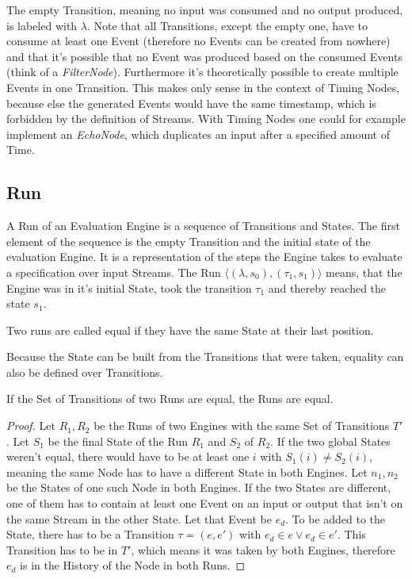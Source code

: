 The empty Transition, meaning no input was consumed and no output produced, is labeled with \(\lambda\).
Note that all Transitions, except the empty one, have to consume at least one Event (therefore no Events can be created from nowhere) and that it's possible that no Event was produced based on the consumed Events (think of a \emph{FilterNode}).
Furthermore it's theoretically possible to create multiple Events in one Transition.
This makes only sense in the context of Timing Nodes, because else the generated Events would have the same timestamp, which is forbidden by the definition of Streams.
With Timing Nodes one could for example implement an \emph{EchoNode}, which duplicates an input after a specified amount of Time.


\subsection{Run}
\label{sec:concepts:def:run}

A Run of an Evaluation Engine is a sequence of Transitions and States.
The first element of the sequence is the empty Transition and the initial state of the evaluation Engine.
It is a representation of the steps the Engine takes to evaluate a specification over input Streams.
The Run \(\langle (\lambda, s_0), (\tau_1, s_1) \rangle\) means, that the Engine was in it's initial State, took the transition \(\tau_1\) and thereby reached the state \(s_1\).

\begin{definition}
  Two runs are called equal if they have the same State at their last position.
\label{def:equal_runs}
\end{definition}

Because the State can be built from the Transitions that were taken, equality can also be defined over Transitions.

\begin{lemma}
If the Set of Transitions of two Runs are equal, the Runs are equal.
\label{lemma:equal_runs_with_transitions}
\end{lemma}
\begin{proof}
  Let \(R_1, R_2\) be the Runs of two Engines with the same Set of Transitions \(T'\).
  Let \(S_1\) be the final State of the Run \(R_1\) and \(S_2\) of \(R_2\).
  If the two global States weren't equal, there would have to be at least one \(i\) with \(S_1(i) \neq S_2(i)\), meaning the same Node has to have a different State in both Engines.
  Let \(n_1, n_2\) be the States of one such Node in both Engines.
  If the two States are different, one of them has to contain at least one Event on an input or output that isn't on the same Stream in the other State.
  Let that Event be \(e_d\).
  To be added to the State, there has to be a Transition \(\tau = (e, e')\) with \(e_d \in e \lor e_d \in e'\).
  This Transition has to be in \(T'\), which means it was taken by both Engines, therefore \(e_d\) is in the History of the Node in both Runs.
\end{proof}

